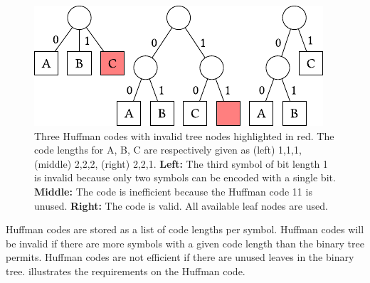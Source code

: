 \begin{figure}
    \centering
    \includegraphics[scale=1]{figures/huffman-trees}
    \caption{
        Three Huffman codes with invalid tree nodes highlighted in red.
        The code lengths for A, B, C are respectively given as (left) 1,1,1, (middle) 2,2,2, (right) 2,2,1.
        \textbf{Left:} The third symbol of bit length 1 is invalid because only two symbols can be encoded with a single bit.
        \textbf{Middle:} The code is inefficient because the Huffman code 11 is unused.
        \textbf{Right:} The code is valid. All available leaf nodes are used.
    }
    \label{fig:huffman-check}
\end{figure}

Huffman codes are stored as a list of code lengths per symbol.
Huffman codes will be invalid if there are more symbols with a given code length than the binary tree permits.
Huffman codes are not efficient if there are unused leaves in the binary tree.
 illustrates the requirements on the Huffman code.



